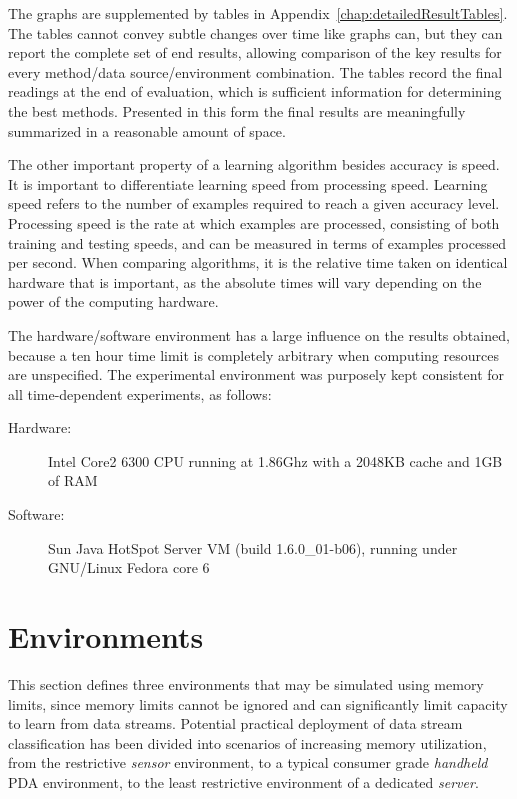 The graphs are supplemented by tables in Appendix~\ref{chap:detailedResultTables}. The tables cannot convey subtle changes over time like graphs can, but they can report the complete set of end results, allowing comparison of the key results for every method/data source/environment combination. The tables record the final readings at the end of evaluation, which is sufficient information for determining the best methods. Presented in this form the final results are meaningfully summarized in a reasonable amount of space.

The other important property of a learning algorithm besides accuracy is speed. It is important to differentiate learning speed from processing speed. Learning speed refers to the number of examples required to reach a given accuracy level. Processing speed is the rate at which examples are processed, consisting of both training and testing speeds, and can be measured in terms of examples processed per second.
When comparing algorithms, it is the relative time taken on identical hardware that is important, as the absolute times will vary depending on the power of the computing hardware.

The hardware/software environment has a large influence on the results obtained, because a ten hour time limit is completely arbitrary when computing resources are unspecified. The experimental environment was purposely kept consistent for all time-dependent experiments, as follows:
\begin{description}
\item[Hardware:] Intel Core2 6300 CPU running at 1.86Ghz with a 2048KB cache and 1GB of RAM
\item[Software:] Sun Java HotSpot Server VM (build 1.6.0\_01-b06), running under GNU/Linux Fedora core 6
\end{description}
\ENDOMIT

\section{Environments}
\label{sec:environments}

This section defines three environments that may be simulated using memory limits, since memory limits cannot be ignored and can significantly limit capacity to learn from data streams.
Potential practical deployment of data stream classification has been divided into scenarios of increasing memory utilization, from the restrictive {\em sensor} environment, to a typical consumer grade {\em handheld} PDA environment, to the least restrictive environment of a dedicated {\em server}.

